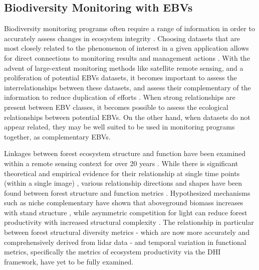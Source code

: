 \documentclass[
  authoryear,
  review,
  3p,
  twocolumn]{elsarticle}
\begin{document}
\hypertarget{biodiversity-monitoring-with-ebvs}{%
\subsection{Biodiversity Monitoring with
EBVs}\label{biodiversity-monitoring-with-ebvs}}

Biodiversity monitoring programs often require a range of information in
order to accurately assess changes in ecosystem integrity
\citep{lindenmayer2010}. Choosing datasets that are most closely related
to the phenomenon of interest in a given application allows for direct
connections to monitoring results and management actions
\citep{pressey2021}. With the advent of large-extent monitoring methods
like satellite remote sensing, and a proliferation of potential EBVs
datasets, it becomes important to assess the interrelationships between
these datasets, and assess their complementary of the information to
reduce duplication of efforts \citep{pereira2013, skidmore2021}. When
strong relationships are present between EBV classes, it becomes
possible to assess the ecological relationships between potential EBVs.
On the other hand, when datasets do not appear related, they may be well
suited to be used in monitoring programs together, as complementary
EBVs.

Linkages between forest ecosystem structure and function have been
examined within a remote sensing context for over 20 years
\citetext{\citealp[
\citet{knyazikhin1998}]{huete2002}; \citealp{myneni1994}}. While there
is significant theoretical and empirical evidence for their relationship
at single time points (within a single image) \citep{myneni1994},
various relationship directions and shapes have been found between
forest structure and function metrics \citep{ali2019}. Hypothesized
mechanisms such as niche complementary have shown that aboveground
biomass increases with stand structure \citep{zhang2012}, while
asymmetric competition for light can reduce forest productivity with
increased structural complexity \citep{bourdier2016}. The relationship
in particular between forest structural diversity metrics - which are
now more accurately and comprehensively derived from lidar data - and
temporal variation in functional metrics, specifically the metrics of
ecosystem productivity via the DHI framework, have yet to be fully
examined.
\end{document}
